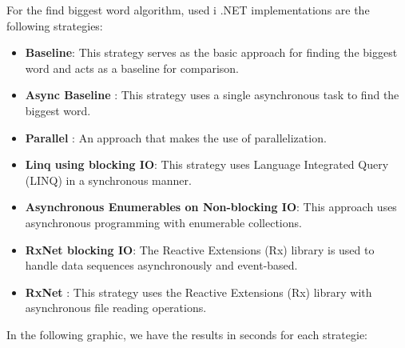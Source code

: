 For the find biggest word algorithm, used i .NET implementations are the following strategies:

\begin{itemize}
    \item \textbf{Baseline}: This strategy serves as the basic approach for finding the biggest word and acts as a baseline for comparison.
    \item \textbf{Async Baseline }: This strategy uses a single asynchronous task to find the biggest word.
    \item \textbf{Parallel }: An approach that makes the use of parallelization.
    \item \textbf{Linq using blocking IO}: This strategy uses Language Integrated Query (LINQ) in a synchronous manner.
    \item \textbf{Asynchronous Enumerables on Non-blocking IO}: This approach uses asynchronous programming with enumerable collections.
    \item \textbf{RxNet blocking  IO}: The Reactive Extensions (Rx) library is used to handle data sequences asynchronously and event-based.
    \item \textbf{RxNet }: This strategy uses the Reactive Extensions (Rx) library with asynchronous file reading operations.
\end{itemize}


In the following graphic, we have the results in seconds for each strategie:

    
